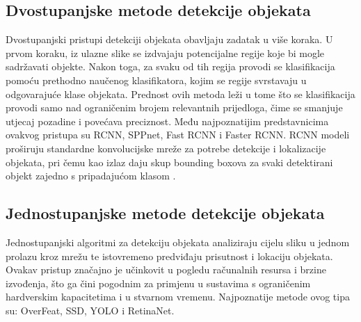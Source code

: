 \documentclass[zavrsnirad]{fer}
\begin{document}
\subsection{Dvostupanjske metode detekcije objekata}
\label{pog:dvostupanjske_metode_detekcije_objekata}
Dvostupanjski pristupi detekciji objekata obavljaju zadatak u više koraka. U prvom koraku, iz ulazne slike se izdvajaju potencijalne regije koje bi mogle sadržavati objekte. 
Nakon toga, za svaku od tih regija provodi se klasifikacija pomoću prethodno naučenog klasifikatora, kojim se regije svrstavaju u odgovarajuće klase objekata. 
Prednost ovih metoda leži u tome što se klasifikacija provodi samo nad ograničenim brojem relevantnih prijedloga, čime se smanjuje utjecaj pozadine i povećava preciznost. 
Među najpoznatijim predstavnicima ovakvog pristupa su RCNN, SPPnet, Fast RCNN i Faster RCNN. 
RCNN modeli proširuju standardne konvolucijske mreže za potrebe detekcije i lokalizacije objekata, pri čemu kao izlaz daju skup bounding boxova za svaki detektirani objekt zajedno s pripadajućom klasom \cite{v7labs_yolo_2023, nskturad}.

\subsection{Jednostupanjske metode detekcije objekata}
\label{pog:jednostupanjske_metode_detekcije_objekata}
Jednostupanjski algoritmi za detekciju objekata analiziraju cijelu sliku u jednom prolazu kroz mrežu te istovremeno predviđaju prisutnost i lokaciju objekata. 
Ovakav pristup značajno je učinkovit u pogledu računalnih resursa i brzine izvođenja, što ga čini pogodnim za primjenu u sustavima s ograničenim hardverskim kapacitetima i u stvarnom vremenu.
Najpoznatije metode ovog tipa su: OverFeat, SSD, YOLO i RetinaNet.
\end{document}
